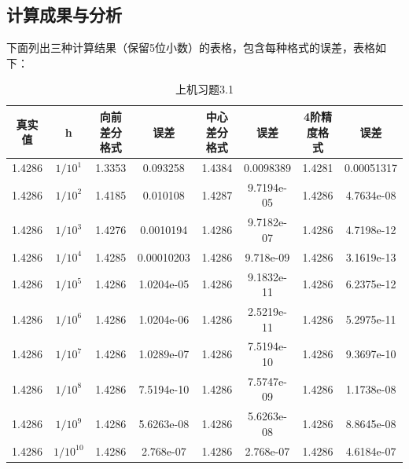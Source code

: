 \documentclass{ctexart}
\begin{document}
\subsection{计算成果与分析}
下面列出三种计算结果（保留5位小数）的表格，包含每种格式的误差，表格如下： 
\begin{center} 
\begin{longtable}{|c|c|c|c|c|c|c|c|}

\caption{上机习题3.1} \\ 
\hline 
真实值& h& 向前差分格式& 误差&中心差分格式& 误差& 4阶精度格式& 误差 \\
\hline
1.4286& $1/10^1$& 1.3353& 0.093258& 1.4384& 0.0098389& 1.4281& 0.00051317\\
\hline
1.4286& $1/10^2$& 1.4185& 0.010108& 1.4287& 9.7194e-05& 1.4286& 4.7634e-08\\
\hline
1.4286& $1/10^3$& 1.4276& 0.0010194& 1.4286& 9.7182e-07& 1.4286& 4.7198e-12\\
\hline
1.4286& $1/10^4$& 1.4285& 0.00010203& 1.4286& 9.718e-09& 1.4286& 3.1619e-13\\
\hline
1.4286& $1/10^5$& 1.4286& 1.0204e-05& 1.4286& 9.1832e-11& 1.4286& 6.2375e-12\\
\hline
1.4286& $1/10^6$& 1.4286& 1.0204e-06& 1.4286& 2.5219e-11& 1.4286& 5.2975e-11\\
\hline
1.4286& $1/10^7$& 1.4286& 1.0289e-07& 1.4286& 7.5194e-10& 1.4286& 9.3697e-10\\
\hline
1.4286& $1/10^8$& 1.4286& 7.5194e-10& 1.4286& 7.5747e-09& 1.4286& 1.1738e-08\\
\hline
1.4286& $1/10^9$& 1.4286& 5.6263e-08& 1.4286& 5.6263e-08& 1.4286& 8.8645e-08\\
\hline
1.4286& $1/10^{10}$& 1.4286& 2.768e-07& 1.4286& 2.768e-07& 1.4286& 4.6184e-07\\
\hline
\end{longtable}
\end{center} 
\end{document}
